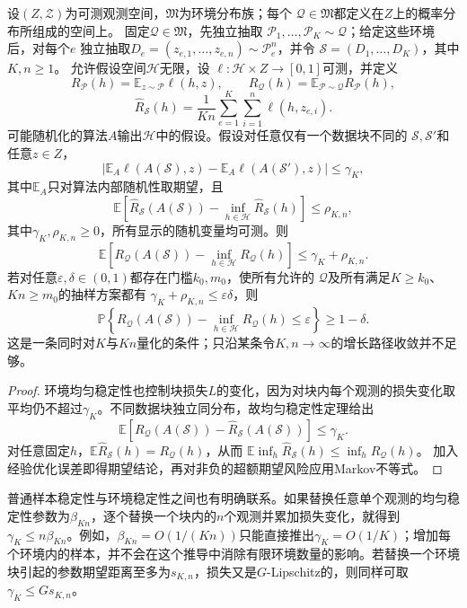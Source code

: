 \begin{theorem}[环境稳定性与平均可学习性]
\label{thm:dg-environment-stability}
设$(Z,\mathcal Z)$为可测观测空间，$\mathfrak M$为环境分布族；每个
$\mathcal Q\in\mathfrak M$都定义在$Z$上的概率分布所组成的空间上。
固定$\mathcal Q\in\mathfrak M$，先独立抽取
$\mathcal P_1,\ldots,\mathcal P_K\sim\mathcal Q$；给定这些环境后，对每个$e$
独立抽取$D_e=(z_{e,1},\ldots,z_{e,n})\sim\mathcal P_e^n$，并令
$\mathcal S=(D_1,\ldots,D_K)$，其中$K,n\geq1$。
允许假设空间$\mathcal H$无限，设
$\ell:\mathcal H\times Z\to[0,1]$可测，并定义
\[
 R_{\mathcal P}(h)=\mathbb E_{z\sim\mathcal P}\ell(h,z),\qquad
 R_{\mathcal Q}(h)=\mathbb E_{\mathcal P\sim\mathcal Q}R_{\mathcal P}(h),
\]
\[
 \widehat R_{\mathcal S}(h)=\frac1{Kn}
 \sum_{e=1}^K\sum_{i=1}^n\ell(h,z_{e,i}).
\]
可能随机化的算法$A$输出$\mathcal H$中的假设。假设对任意仅有一个数据块不同的
$\mathcal S,\mathcal S'$和任意$z\in Z$，
\[
 \left|\mathbb E_A\ell(A(\mathcal S),z)
 -\mathbb E_A\ell(A(\mathcal S'),z)\right|\leq\gamma_K,
\]
其中$\mathbb E_A$只对算法内部随机性取期望，且
\[
 \mathbb E\!\left[\widehat R_{\mathcal S}(A(\mathcal S))-
                  \inf_{h\in\mathcal H}\widehat R_{\mathcal S}(h)\right]\leq\rho_{K,n},
\]
其中$\gamma_K,\rho_{K,n}\geq0$，所有显示的随机变量均可测。则
\[
 \mathbb E\!\left[R_{\mathcal Q}(A(\mathcal S))-
                  \inf_{h\in\mathcal H}R_{\mathcal Q}(h)\right]
 \leq\gamma_K+\rho_{K,n}.
\]
若对任意$\varepsilon,\delta\in(0,1)$都存在门槛$k_0,m_0$，使所有允许的
$\mathcal Q$及所有满足$K\geq k_0$、$Kn\geq m_0$的抽样方案都有
$\gamma_K+\rho_{K,n}\leq\varepsilon\delta$，则
\[
 \mathbb P\left\{
 R_{\mathcal Q}(A(\mathcal S))
 -\inf_{h\in\mathcal H}R_{\mathcal Q}(h)
 \leq\varepsilon\right\}\geq1-\delta.
\]
这是一条同时对$K$与$Kn$量化的条件；只沿某条令$K,n\to\infty$的增长路径收敛并不足够。
\end{theorem}
\begin{proof}
环境均匀稳定性也控制块损失$L$的变化，因为对块内每个观测的损失变化取平均仍不超过$\gamma_K$。不同数据块独立同分布，故均匀稳定性定理给出
\[
 \mathbb E[R_{\mathcal Q}(A(\mathcal S))-\widehat R_{\mathcal S}(A(\mathcal S))]\leq\gamma_K.
\]
对任意固定$h$，$\mathbb E\widehat R_{\mathcal S}(h)=R_{\mathcal Q}(h)$，从而
$\mathbb E\inf_h\widehat R_{\mathcal S}(h)\leq\inf_hR_{\mathcal Q}(h)$。
加入经验优化误差即得期望结论，再对非负的超额期望风险应用Markov不等式。
\end{proof}

普通样本稳定性与环境稳定性之间也有明确联系。如果替换任意单个观测的均匀稳定性参数为$\beta_{Kn}$，逐个替换一个块内的$n$个观测并累加损失变化，就得到
$\gamma_K\leq n\beta_{Kn}$。例如，$\beta_{Kn}=O(1/(Kn))$只能直接推出$\gamma_K=O(1/K)$；增加每个环境内的样本，并不会在这个推导中消除有限环境数量的影响。若替换一个环境块引起的参数期望距离至多为$s_{K,n}$，损失又是$G$-Lipschitz的，则同样可取$\gamma_K\leq Gs_{K,n}$。

